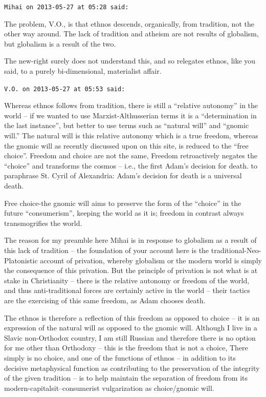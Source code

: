 \begin{footnotesize}
\begin{sffamily}
\hfill

\texttt{Mihai on 2013-05-27 at 05:28 said:}

The problem, V.O., is that ethnos descends, organically, from tradition, not the other way around. The lack of tradition and atheism are not results of globalism, but globalism is a result of the two.

The new-right surely does not understand this, and so relegates ethnos, like you said, to a purely bi-dimensional, materialist affair.

\hfill

\texttt{V.O. on 2013-05-27 at 05:53 said:}

Whereas ethnos follows from tradition, there is still a ``relative autonomy'' in the world -- if we wanted to use Marxist-Althusserian terms it is a ``determination in the last instance'', but better to use terms such as ``natural will'' and ``gnomic will.'' The natural will is this relative autonomy which is a true freedom, whereas the gnomic will as recently discussed upon on this site, is reduced to the ``free choice''. Freedom and choice are not the same, Freedom retroactively negates the ``choice'' and transforms the cosmos -- i.e., the first Adam's decision for death. to paraphrase St. Cyril of Alexandria: Adam's decision for death is a universal death.

Free choice-the gnomic will aims to preserve the form of the ``choice'' in the future ``consumerism'', keeping the world as it is; freedom in contrast always transmogrifies the world.

The reason for my preamble here Mihai is in response to globalism as a result of this lack of tradition -- the foundation of your account here is the traditional-Neo-Platonistic account of privation, whereby globalism or the modern world is simply the consequence of this privation. But the principle of privation is not what is at stake in Christianity -- there is the relative autonomy or freedom of the world, and thus anti-traditional forces are certainly active in the world -- their tactics are the exercising of this same freedom, as Adam chooses death.

The ethnos is therefore a reflection of this freedom as opposed to choice -- it is an expression of the natural will as opposed to the gnomic will. Although I live in a Slavic non-Orthodox country, I am still Russian and therefore there is no option for me other than Orthodoxy -- this is the freedom that is not a choice, There simply is no choice, and one of the functions of ethnos -- in addition to its decisive metaphysical function as contributing to the preservation of the integrity of the given tradition -- is to help maintain the separation of freedom from its modern-capitalsit--consumerist vulgarization as choice/gnomic will.


\end{sffamily}
\end{footnotesize}
